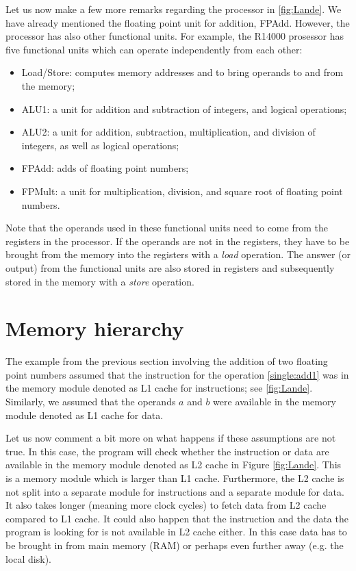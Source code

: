 Let us now make a few more remarks regarding the processor in
\autoref{fig:Lande}. We have already mentioned the floating point unit for
addition, FPAdd. However, the processor has also other functional units. For
example, the R14000 prosessor has five functional units which can operate
independently from each other:
\begin{itemize}
\item Load/Store: computes memory addresses and to bring operands to and from
the memory;
\item ALU1: a unit for addition and subtraction of integers, and logical
operations;
\item ALU2: a unit for addition, subtraction, multiplication, and division of
integers, as well as logical operations;
\item FPAdd: adds of floating point numbers;
\item FPMult: a unit for multiplication, division, and square root of floating
point numbers.
\end{itemize}
Note that the operands used in these functional units need to come from the
registers in the processor. If the operands are not in the registers, they have
to be brought from the memory into the registers with a {\em load} operation.
The answer (or output) from the functional units are also stored in registers
and subsequently stored in the memory with a {\em store} operation.

\section{Memory hierarchy}

The example from the previous section involving the addition of two floating
point numbers assumed that the instruction for the operation \eqref{single:add1}
was in the memory module denoted as L1 cache for instructions; see
\autoref{fig:Lande}. Similarly, we assumed that the operands $a$ and $b$ were
available in the memory module denoted as L1 cache for data.

Let us now comment a bit more on what happens if these assumptions are not true.
In this case, the program will check whether the instruction or data are
available in the memory module denoted as L2 cache in Figure \ref{fig:Lande}.
This is a memory module which is larger than L1 cache. Furthermore, the L2 cache
is not split into a separate module for instructions and a separate module for
data. It also takes longer (meaning more clock cycles) to fetch data from L2
cache compared to L1 cache. It could also happen that the instruction and the
data the program is looking for is not available in L2 cache either. In this
case data has to be brought in from main memory (RAM) or perhaps even further
away (e.g. the local disk).

